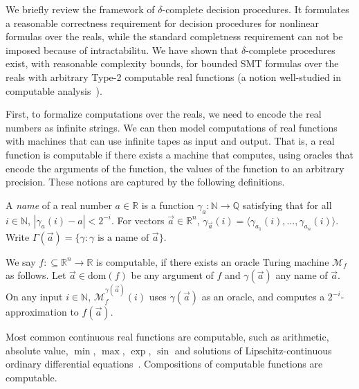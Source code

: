 \documentclass[envcountsect]{llncs}
\newcommand{\dom}{\mathrm{dom}}
\begin{document}
We briefly review the framework of $\delta$-complete decision procedures.
It formulates a reasonable correctness requirement for decision
procedures for nonlinear
formulas over the reals, while the standard completness requirement can not be
imposed because of intractabilitu. We have shown that $\delta$-complete
procedures exist,
with reasonable complexity bounds, for bounded SMT formulas over the reals with
arbitrary Type-2 computable real functions (a notion well-studied in computable
analysis~\cite{}).

First, to formalize computations over the reals, we need to encode the
real numbers as infinite strings. We can then model
computations of real functions with machines that can use infinite tapes as
input and output. That is, a real function is computable if there exists a
machine that computes, using oracles that encode the arguments of the function,
the values of the function to an arbitrary precision. These
notions are captured by the following definitions.
\begin{definition}
A {\em name} of a real number $a\in \mathbb{R}$ is a function
$\mathcal{\gamma}_a: \mathbb{N}\rightarrow \mathbb{Q}$ satisfying that for all
$i\in \mathbb{N}$, $|\gamma_a(i) - a|<2^{-i}.$ For vectors $\vec a\in
\mathbb{R}^n$,
$\gamma_{\vec a}(i) = \langle \gamma_{a_1}(i), ..., \gamma_{a_n}(i)\rangle$.
Write $\Gamma(\vec a) = \{\gamma: \gamma\mbox{ is a name of }\vec a\}$.
\end{definition}
\begin{definition} We say
$f:\subseteq\mathbb{R}^n\rightarrow \mathbb{R}$ is computable, if there exists
an oracle Turing machine $\mathcal{M}_f$ as follows. Let $\vec a\in \dom(f)$
be any argument of $f$ and $\gamma(\vec a)$
any name of $\vec a$. On any input $i\in \mathbb{N}$,
$\mathcal{M}_f^{\gamma(\vec a)}(i)$ uses $\gamma(\vec a)$ as an oracle, and
computes a $2^{-i}$-approximation to $f(\vec a)$.
\end{definition}
Most common continuous real functions are computable, such as
arithmetic, absolute value, $\min$, $\max$, $\exp$, $\sin$ and solutions of
Lipschitz-continuous ordinary differential equations~\cite{CAbook}. Compositions
of computable functions are computable.
\end{document}
